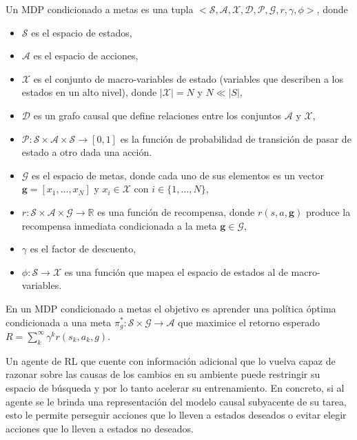     Un MDP condicionado a metas es
una tupla $<\mathcal{S}, \mathcal{A}, \mathcal{X},
\mathcal{D}, \mathcal{P}, \mathcal{G}, r, \gamma, \phi>$, donde 
\begin{itemize}
    \item $\mathcal{S}$ es el espacio de estados, 
    \item $\mathcal{A}$ es el espacio de acciones, 
    \item $\mathcal{X}$ es el conjunto de
    macro-variables de estado \cite{chalupka2014visual} (variables 
    que describen a los estados en un alto nivel), donde $|\mathcal{X}| = N$ y
    $N \ll |S|$,
    \item $\mathcal{D}$ es un grafo causal
    que define relaciones entre
    los conjuntos $\mathcal{A}$ y $\mathcal{X}$, 
    \item $\mathcal{P}: \mathcal{S} \times \mathcal{A} \times \mathcal{S} \rightarrow [0, 1]
     $ es la función de probabilidad de transición de pasar de estado a otro dada una acción. 
    \item $\mathcal{G}$ es el espacio de metas, donde cada uno de sus elementos es un vector $\mathbf{g} = [x_1, \dots, x_N]$ y $x_i \in \mathcal{X}$
    con $i \in \{1, \dots, N\}$,
    \item $r : \mathcal{S} \times \mathcal{A} \times \mathcal{G} \rightarrow \mathbb{R}$ es una función
de recompensa, donde $r(s, a, \mathbf{g})$ produce la recompensa inmediata condicionada a la meta $\mathbf{g} \in \mathcal{G}$,
\item $\gamma$ es el factor de descuento,
\item $\phi : \mathcal{S} \rightarrow \mathcal{X}$ es una función que mapea el espacio de estados al de macro-variables.
\end{itemize}

En un MDP condicionado a metas el objetivo es aprender una 
política óptima condicionada a una meta $\pi^*_g: \mathcal{S} \times \mathcal{G} \rightarrow \mathcal{A}$ que maximice el retorno esperado $R = \sum_{k}^{\infty}\gamma^{k} r(s_k, a_k, g)$.

Un agente de RL que cuente con información adicional que lo vuelva 
capaz de razonar sobre las causas de los cambios en su ambiente 
puede restringir su espacio de búsqueda y
por lo tanto acelerar su entrenamiento.
En concreto, si al agente se le brinda una representación del modelo
causal subyacente de su tarea, esto le permite perseguir acciones que lo lleven a
estados deseados o evitar elegir acciones que lo lleven a 
estados no deseados.

